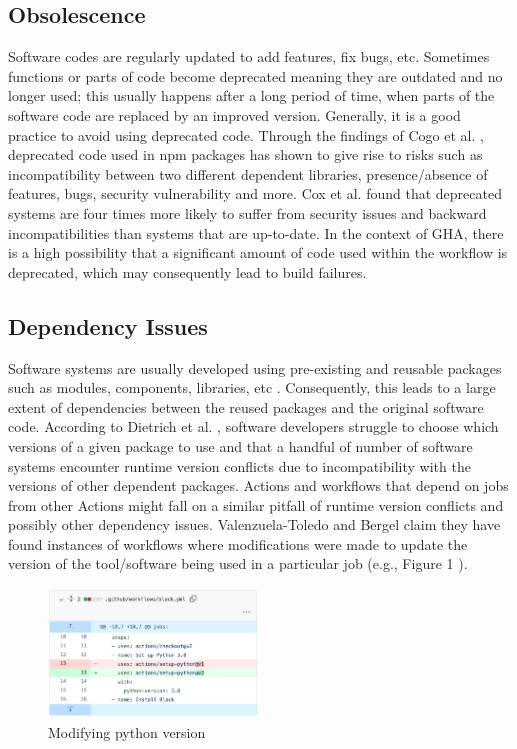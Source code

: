 \documentclass[conference]{IEEEtran}
\begin{document}
    \subsection{Obsolescence}
        Software codes are regularly updated to add features, fix bugs, etc. Sometimes functions or parts of code become deprecated meaning they are outdated and no longer used; this usually happens after a long period of time, when parts of the software code are replaced by an improved version. Generally, it is a good practice to avoid using deprecated code. Through the findings of Cogo et al. \cite{cogo2021deprecation}, deprecated code used in npm packages has shown to give rise to risks such as incompatibility between two different dependent libraries, presence/absence of features, bugs, security vulnerability and more. Cox et al. \cite{cox2015measuring} found that deprecated systems are four times more likely to suffer from security issues and backward incompatibilities than systems that are up-to-date. In the context of GHA, there is a high possibility that a significant amount of code used within the workflow is deprecated, which may consequently lead to build failures.

    \subsection{Dependency Issues}
        Software systems are usually developed using pre-existing and reusable packages such as modules, components, libraries, etc \cite{decan2019empirical}\cite{soto2021comprehensive}. Consequently, this leads to a large extent of dependencies between the reused packages and the original software code. According to Dietrich et al. \cite{dietrich2019dependency}, software developers struggle to choose which versions of a given package to use and that a handful of number of software systems encounter runtime version conflicts due to incompatibility with the versions of other dependent packages. Actions and workflows that depend on jobs from other Actions might fall on a similar pitfall of runtime version conflicts and possibly other dependency issues. Valenzuela-Toledo and Bergel \cite{valenzuela2022evolution} claim they have found instances of workflows where modifications were made to update the version of the tool/software being used in a particular job (e.g., Figure 1 \cite{valenzuela2022evolution}).

\begin{figure} [h]
\includegraphics[width=0.5\textwidth]{Figure 1.png}
\caption{Modifying python version \cite{valenzuela2022evolution} }
\end{figure}
\end{document}

